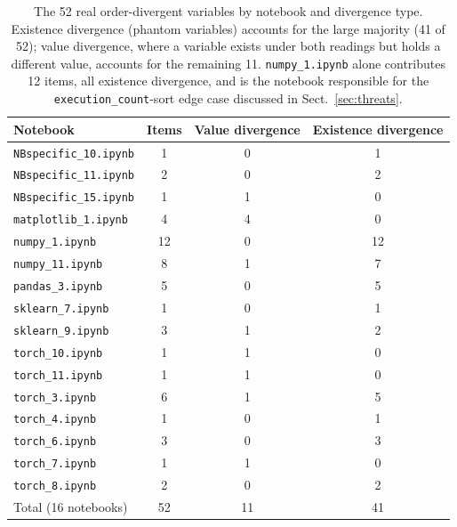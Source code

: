 \documentclass[11pt]{article}
\begin{document}
\begin{table}[t]
\centering\small
\begin{tabular}{@{}lccc@{}}
\toprule
Notebook & Items & Value divergence & Existence divergence \\
\midrule
\texttt{NBspecific\_10.ipynb} & 1 & 0 & 1 \\
\texttt{NBspecific\_11.ipynb} & 2 & 0 & 2 \\
\texttt{NBspecific\_15.ipynb} & 1 & 1 & 0 \\
\texttt{matplotlib\_1.ipynb} & 4 & 4 & 0 \\
\texttt{numpy\_1.ipynb} & 12 & 0 & 12 \\
\texttt{numpy\_11.ipynb} & 8 & 1 & 7 \\
\texttt{pandas\_3.ipynb} & 5 & 0 & 5 \\
\texttt{sklearn\_7.ipynb} & 1 & 0 & 1 \\
\texttt{sklearn\_9.ipynb} & 3 & 1 & 2 \\
\texttt{torch\_10.ipynb} & 1 & 1 & 0 \\
\texttt{torch\_11.ipynb} & 1 & 1 & 0 \\
\texttt{torch\_3.ipynb} & 6 & 1 & 5 \\
\texttt{torch\_4.ipynb} & 1 & 0 & 1 \\
\texttt{torch\_6.ipynb} & 3 & 0 & 3 \\
\texttt{torch\_7.ipynb} & 1 & 1 & 0 \\
\texttt{torch\_8.ipynb} & 2 & 0 & 2 \\
\midrule
Total (16 notebooks) & 52 & 11 & 41 \\
\bottomrule
\end{tabular}
\caption{The 52 real order-divergent variables by notebook and
divergence type. Existence divergence (phantom variables) accounts for
the large majority (41 of 52); value divergence, where a variable exists
under both readings but holds a different value, accounts for the
remaining 11. \texttt{numpy\_1.ipynb} alone contributes 12 items, all
existence divergence, and is the notebook responsible for the
\texttt{execution\_count}-sort edge case discussed in
Sect.~\ref{sec:threats}.}
\label{tab:realnb}
\end{table}
\end{document}
